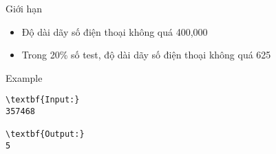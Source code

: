 Giới hạn
\begin{itemize}
	\item Độ dài dãy số điện thoại không quá 400,000
	\item Trong 20\% số test, độ dài dãy số điện thoại không quá 625
\end{itemize}
Example
\begin{verbatim}
\textbf{Input:}
357468

\textbf{Output:}
5\end{verbatim}